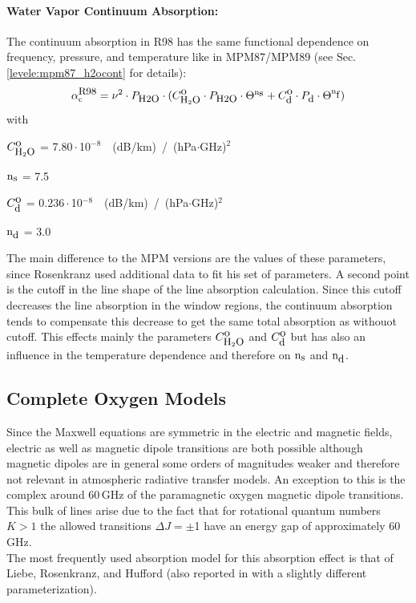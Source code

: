 \paragraph{Water Vapor Continuum Absorption:}
\label{levele:pwr98_h2ocont}
The continuum absorption in R98 has the same functional dependence on frequency,
pressure, and temperature like in MPM87/MPM89 (see Sec. \ref{levele:mpm87_h2ocont}
for details):
\begin{equation} 
  \label{eq:pwr98:abscont}
  \alpha^{\mbox{\rm \small R98}}_{\rm c} = \nu^2 \cdot P_{\mbox{\rm \small H2O}} \cdot 
               (C^{\mbox{\rm o}}_{\mbox{\rm \small H}_{2}\mbox{\rm \small O}} \cdot P_{\mbox{\rm \small H2O}} \cdot \Theta^{{\rm n}_{\mbox{\rm \small s}}} + 
                C^{\mbox{\rm o}}_{\mbox{\rm \small d}} \cdot P_{\mbox{\rm \small d}}  \cdot \Theta^{{\rm n}_{\mbox{\rm \small f}}})
\end{equation}
with
\begin{description}
\item{$C^{\mbox{\rm o}}_{\mbox{\rm \small H}_{2}\mbox{\rm \small O}}$}   = 7.80\,$\cdot$\,10$^{-8}$~~(dB/km)~/~(hPa$\cdot$GHz)$^2$
\item{${\rm n}_{\mbox{\rm \small s}}$}    = 7.5
\item{$C^{\mbox{\rm o}}_{\mbox{\rm \small d}}$}   =  0.236\,$\cdot$\,10$^{-8}$~~(dB/km)~/~(hPa$\cdot$GHz)$^2$
\item{${\rm n}_{\mbox{\rm \small d}}$}    = 3.0
\end{description}
The main difference to the MPM versions are the values of these 
parameters, since Rosenkranz used additional data to fit his set of 
parameters. A second point is the cutoff in the line shape of the line 
absorption calculation. Since this cutoff decreases the line absorption 
in the window regions, the continuum absorption tends to compensate this 
decrease to get the same total absorption as withouot cutoff. This effects 
mainly the parameters $C^{\mbox{\rm o}}_{\mbox{\rm \small H}_{2}\mbox{\rm \small O}}$ and $C^{\mbox{\rm o}}_{\mbox{\rm \small d}}$ but has also an influence in the 
temperature dependence and therefore on ${\rm n}_{\mbox{\rm \small s}}$ and ${\rm n}_{\mbox{\rm \small d}}$.




\subsection{Complete Oxygen Models}
\label{levelc:02_models}
%
Since the Maxwell equations are symmetric in the electric and
magnetic fields, electric as well as magnetic dipole transitions 
are both possible although magnetic dipoles are in general some
orders of magnitudes weaker and therefore not relevant in
atmospheric radiative transfer models. An exception to this is the complex 
around 60\,GHz of the paramagnetic oxygen magnetic dipole transitions. 
This bulk of lines arise due to the fact that for rotational 
quantum numbers $K>1$ the allowed transitions \mbox{$\Delta J = \pm$1} 
have an energy gap of approximately 60\,GHz.\\
The most frequently used absorption model for this absorption effect is that of
Liebe, Rosenkranz, and Hufford \citep{liebeetal:92} (also reported in 
\citet{pwr:93} with a slightly different parameterization).

